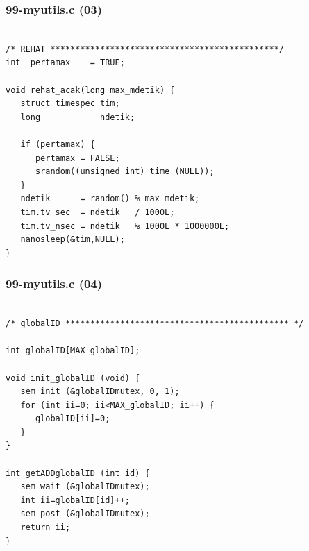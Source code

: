 \documentclass[xcolor=table, notheorems, hyperref={pdfpagelabels=false}]{beamer}
\begin{document}
\begin{frame}[fragile]
\frametitle{99-myutils.c (03)}
\begin{lstlisting}[basicstyle=\ttfamily\small]        %  65
% \begin{lstlisting}[basicstyle=\ttfamily\large]        %  54

/* REHAT **********************************************/
int  pertamax    = TRUE;

void rehat_acak(long max_mdetik) {
   struct timespec tim;
   long            ndetik;
  
   if (pertamax) {
      pertamax = FALSE;
      srandom((unsigned int) time (NULL));
   }
   ndetik      = random() % max_mdetik;
   tim.tv_sec  = ndetik   / 1000L;
   tim.tv_nsec = ndetik   % 1000L * 1000000L;
   nanosleep(&tim,NULL);
} 

\end{lstlisting}
\end{frame}

\begin{frame}[fragile]
\frametitle{99-myutils.c (04)}
\begin{lstlisting}[basicstyle=\ttfamily\small]        %  65
% \begin{lstlisting}[basicstyle=\ttfamily\large]        %  54

/* globalID ********************************************* */

int globalID[MAX_globalID];

void init_globalID (void) {
   sem_init (&globalIDmutex, 0, 1);
   for (int ii=0; ii<MAX_globalID; ii++) {
      globalID[ii]=0;
   }
}

int getADDglobalID (int id) {
   sem_wait (&globalIDmutex);
   int ii=globalID[id]++;
   sem_post (&globalIDmutex);
   return ii;
}

\end{lstlisting}
\end{frame}
\end{document}
